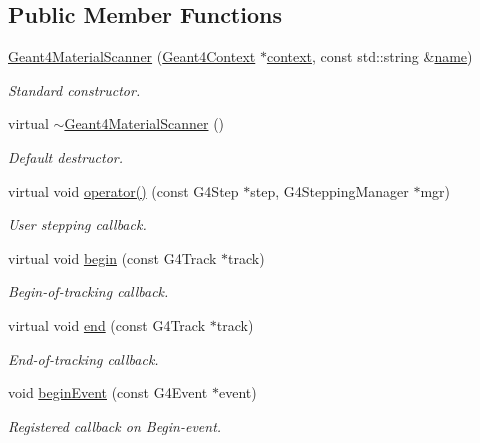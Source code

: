 \subsection*{Public Member Functions}
\begin{DoxyCompactItemize}
\item 
\hyperlink{class_d_d4hep_1_1_simulation_1_1_geant4_material_scanner_a29c140b5f46bc9ff863a845b79e546ee}{Geant4\+Material\+Scanner} (\hyperlink{class_d_d4hep_1_1_simulation_1_1_geant4_context}{Geant4\+Context} $\ast$\hyperlink{class_d_d4hep_1_1_simulation_1_1_geant4_action_aa9d87f0ec2a72b7fc2591b18f98d75cf}{context}, const std\+::string \&\hyperlink{class_d_d4hep_1_1_simulation_1_1_geant4_action_af374e70b014d16afb81dd9d77cc3894b}{name})
\begin{DoxyCompactList}\small\item\em Standard constructor. \end{DoxyCompactList}\item 
virtual \hyperlink{class_d_d4hep_1_1_simulation_1_1_geant4_material_scanner_af31f21a00b4c9cab1a73aeddb1a3773b}{$\sim$\+Geant4\+Material\+Scanner} ()
\begin{DoxyCompactList}\small\item\em Default destructor. \end{DoxyCompactList}\item 
virtual void \hyperlink{class_d_d4hep_1_1_simulation_1_1_geant4_material_scanner_abd897a6b73a1855f674962d0e6126c17}{operator()} (const G4\+Step $\ast$step, G4\+Stepping\+Manager $\ast$mgr)
\begin{DoxyCompactList}\small\item\em User stepping callback. \end{DoxyCompactList}\item 
virtual void \hyperlink{class_d_d4hep_1_1_simulation_1_1_geant4_material_scanner_adb6b4a72be62b6b7c440db01d147d7e1}{begin} (const G4\+Track $\ast$track)
\begin{DoxyCompactList}\small\item\em Begin-\/of-\/tracking callback. \end{DoxyCompactList}\item 
virtual void \hyperlink{class_d_d4hep_1_1_simulation_1_1_geant4_material_scanner_a08dd7d2ac6bece93af5709c1c2edc64c}{end} (const G4\+Track $\ast$track)
\begin{DoxyCompactList}\small\item\em End-\/of-\/tracking callback. \end{DoxyCompactList}\item 
void \hyperlink{class_d_d4hep_1_1_simulation_1_1_geant4_material_scanner_af8c21aaac99b7f654c98f83a3382c9f4}{begin\+Event} (const G4\+Event $\ast$event)
\begin{DoxyCompactList}\small\item\em Registered callback on Begin-\/event. \end{DoxyCompactList}\end{DoxyCompactItemize}
